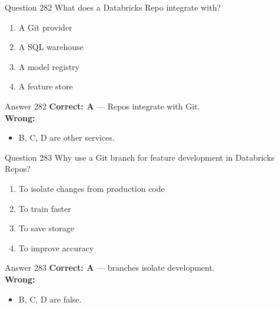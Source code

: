 \documentclass[aspectratio=169,11pt]{beamer}
\begin{document}
	\begin{frame}{Question 282}
		What does a Databricks Repo integrate with?
		\begin{enumerate}[label=\Alph*.]
			\item A Git provider
			\item A SQL warehouse
			\item A model registry
			\item A feature store
		\end{enumerate}
	\end{frame}
	\begin{frame}{Answer 282}
		\textbf{Correct: A} --- Repos integrate with Git.\\
		\vspace{0.5em}
		\textbf{Wrong:}
		\begin{itemize}
			\item B, C, D are other services.
		\end{itemize}
	\end{frame}
	
	\begin{frame}{Question 283}
		Why use a Git branch for feature development in Databricks Repos?
		\begin{enumerate}[label=\Alph*.]
			\item To isolate changes from production code
			\item To train faster
			\item To save storage
			\item To improve accuracy
		\end{enumerate}
	\end{frame}
	\begin{frame}{Answer 283}
		\textbf{Correct: A} --- branches isolate development.\\
		\vspace{0.5em}
		\textbf{Wrong:}
		\begin{itemize}
			\item B, C, D are false.
		\end{itemize}
	\end{frame}
	
\end{document}
